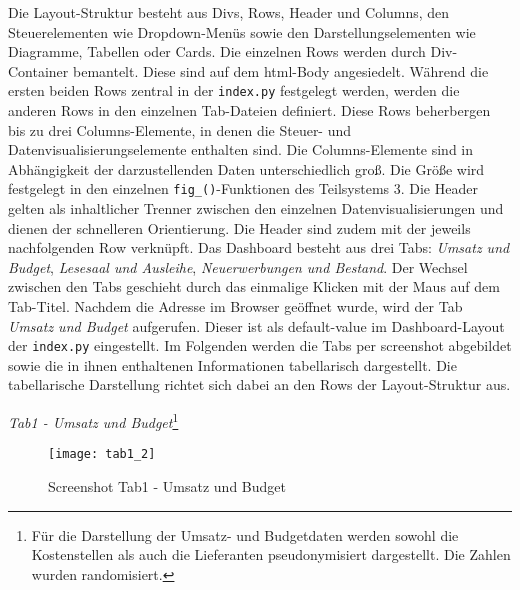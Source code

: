     Die Layout-Struktur besteht aus Divs, Rows, Header und Columns, den Steuerelementen wie Dropdown-Menüs sowie den Darstellungselementen wie Diagramme, Tabellen
    oder Cards. Die einzelnen Rows werden durch Div-Container bemantelt. Diese sind auf dem html-Body angesiedelt.
    Während die ersten beiden Rows zentral in der \texttt{index.py} festgelegt werden, werden die anderen Rows in den einzelnen Tab-Dateien definiert. 
    Diese Rows beherbergen bis zu drei Columns-Elemente, in denen die Steuer- und Datenvisualisierungselemente enthalten sind.
    Die Columns-Elemente sind in Abhängigkeit der darzustellenden Daten unterschiedlich groß. 
    Die Größe wird festgelegt in den einzelnen \texttt{fig\_()}-Funktionen des Teilsystems 3.
    Die Header gelten als inhaltlicher Trenner zwischen den einzelnen Datenvisualisierungen und dienen der schnelleren Orientierung. 
    Die Header sind zudem mit der jeweils nachfolgenden Row verknüpft. Das Dashboard besteht aus drei Tabs: \textit{Umsatz und Budget}, 
    \textit{Lesesaal und Ausleihe}, \textit{Neuerwerbungen und Bestand}. Der Wechsel zwischen den Tabs geschieht durch das einmalige
    Klicken mit der Maus auf dem Tab-Titel. Nachdem die Adresse im Browser geöffnet wurde, wird der Tab \textit{Umsatz und Budget} aufgerufen. Dieser ist
    als default-value im Dashboard-Layout der \texttt{index.py} eingestellt. Im Folgenden werden die Tabs per screenshot abgebildet sowie 
    die in ihnen enthaltenen Informationen tabellarisch dargestellt. Die tabellarische Darstellung richtet sich dabei an den Rows der Layout-Struktur aus. 


    \recalctypearea
    
    \textit{Tab1 - Umsatz und Budget}\footnote{  Für die Darstellung der Umsatz- und
    Budgetdaten werden sowohl die Kostenstellen als auch die Lieferanten pseudonymisiert dargestellt. Die Zahlen
    wurden randomisiert.}
    \begin{figure}[H]
        \centering
            \texttt{[image: tab1\_2]}
            \caption{Screenshot Tab1 - Umsatz und Budget}
            \label{fig:tab1}
    \end{figure}

